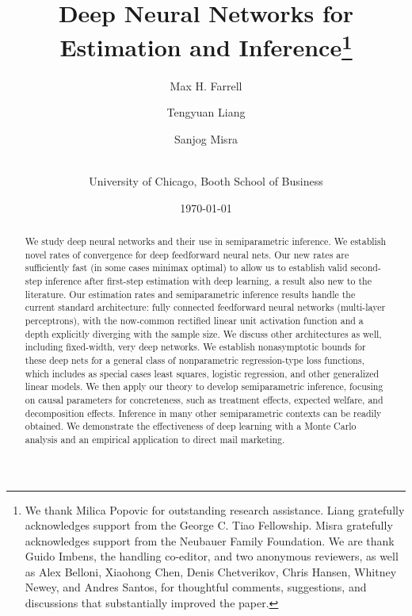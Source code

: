 \documentclass[11pt]{article}
\numberwithin{equation}{section}
\theoremstyle{definition}
\begin{document}
\title{
	\vspace{-0.5in}
	Deep Neural Networks for Estimation and Inference\thanks{
		We thank Milica Popovic for outstanding research assistance. Liang gratefully acknowledges support from the George C. Tiao Fellowship. Misra gratefully acknowledges support from the Neubauer Family Foundation. We are thank Guido Imbens, the handling co-editor, and two anonymous reviewers, as well as Alex Belloni, Xiaohong Chen, Denis Chetverikov, Chris Hansen, Whitney Newey, and Andres Santos, for thoughtful comments, suggestions, and discussions that substantially improved the paper.
	}
}
\author{
	Max H. Farrell \and
	Tengyuan Liang \and
	Sanjog Misra \and
	\\
	University of Chicago, Booth School of Business
}
\date{\today}
\maketitle



\begin{abstract} 
We study deep neural networks and their use in semiparametric inference. We establish novel rates of convergence for deep feedforward neural nets. Our new rates are sufficiently fast (in some cases minimax optimal) to allow us to establish valid second-step inference after first-step estimation with deep learning, a result also new to the literature. Our estimation rates and semiparametric inference results handle the current standard architecture: fully connected feedforward neural networks (multi-layer perceptrons), with the now-common rectified linear unit activation function and a depth explicitly diverging with the sample size. We discuss other architectures as well, including fixed-width, very deep networks. We establish nonasymptotic bounds for these deep nets for a general class of nonparametric regression-type loss functions, which includes as special cases least squares, logistic regression, and other generalized linear models. We then apply our theory to develop semiparametric inference, focusing on causal parameters for concreteness, such as treatment effects, expected welfare, and decomposition effects. Inference in many other semiparametric contexts can be readily obtained. We demonstrate the effectiveness of deep learning with a Monte Carlo analysis and an empirical application to direct mail marketing.
\end{abstract}


\bigskip
\end{document}
